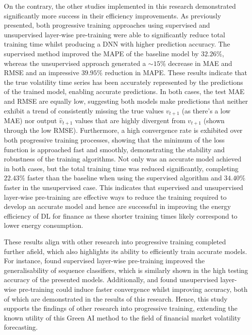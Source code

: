 \documentclass[a4paper, 11pt]{report}
\begin{document}
    On the contrary, the other studies implemented in this research demonstrated significantly more success in their efficiency improvements. As previously presented, both progressive training approaches using supervised and unsupervised layer-wise pre-training were able to significantly reduce total training time whilst producing a DNN with higher prediction accuracy. The supervised method improved the MAPE of the baseline model by $32.26\%$, whereas the unsupervised approach generated a $\sim \! 15\%$ decrease in MAE and RMSE and an impressive $39.95\%$ reduction in MAPE. These results indicate that the true volatility time series has been accurately represented by the predictions of the trained model, enabling accurate predictions. In both cases, the test MAE and RMSE are equally low, suggesting both models make predictions that neither exhibit a trend of consistently missing the true values $v_{t+1}$ (as there's a low MAE) nor output $\hat{v}_{t+1}$ values that are highly divergent from $v_{t+1}$ (shown through the low RMSE). Furthermore, a high convergence rate is exhibited over both progressive training processes, showing that the minimum of the loss function is approached fast and smoothly, demonstrating the stability and robustness of the training algorithms. Not only was an accurate model achieved in both cases, but the total training time was reduced significantly, completing $22.43\%$ faster than the baseline when using the supervised algorithm and $34.40\%$ faster in the unsupervised case. This indicates that supervised and unsupervised layer-wise pre-training are effective ways to reduce the training required to develop an accurate model and hence are successful in improving the energy efficiency of DL for finance as these shorter training times likely correspond to lower energy consumption.

    These results align with other research into progressive training completed further afield, which also highlights its ability to efficiently train accurate models. For instance, \citet{ienco-2019} found supervised layer-wise pre-training improved the generalisability of sequence classifiers, which is similarly shown in the high testing accuracy of the presented models. Additionally, \citet{xu-2018} and \citet{sagheer-2019} found unsupervised layer-wise pre-training could induce faster convergence whilst improving accuracy, both of which are demonstrated in the results of this research. Hence, this study supports the findings of other research into progressive training, extending the known utility of this Green AI method to the field of financial market volatility forecasting.
\end{document}
